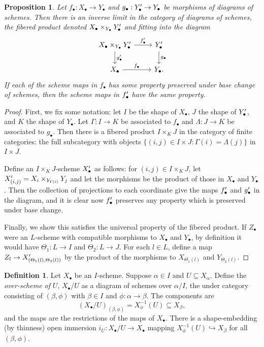 \documentclass[proquest]{uwthesis}[2014/11/13]
\newtheorem{prop}[theorem]{Proposition}
\theoremstyle{definition}
\newtheorem{definition}[theorem]{Definition}
\begin{document}
\begin{prop}
	\label{thm:fiberedprod}
	Let $f_\bullet : X_\bullet \rightarrow Y_\bullet$ and $g_\bullet : Y_\bullet\rq{} \rightarrow Y_\bullet$ be morphisms of diagrams of schemes.
	Then there is an inverse limit in the category of diagrams of schemes, the fibered product denoted $X_\bullet \times_{Y_\bullet} Y_\bullet\rq{}$ and fitting into the diagram
	\[
	\begin{tikzcd}
	X_\bullet \times_{Y_\bullet} Y_\bullet\rq{} \arrow{r}{f_\bullet\rq{}} \arrow{d}{g_\bullet\rq{}} & Y_\bullet\rq{} \arrow{d}{g_\bullet} \\
	X_\bullet \arrow{r}{f_\bullet} & Y_\bullet.
	\end{tikzcd}
	\]
	If each of the scheme maps in $f_\bullet$ has some property preserved under base change of schemes, then the scheme maps in $f_\bullet\rq{}$ have the same property.
\end{prop}
\begin{proof}
	First, we fix some notation: let $I$ be the shape of $X_\bullet$, $J$ the shape of $Y_\bullet\rq{}$, and $K$ the shape of $Y_\bullet$.
	Let $\Gamma : I \rightarrow K$ be associated to $f_\bullet$ and $\Lambda : J \rightarrow K$ be associated to $g_\bullet$.
	Then there is a fibered product $I \times_K J$ in the category of finite categories: the full subcategory with objects $\{(i, j) \in I \times J : \Gamma(i) = \Lambda(j) \}$ in $I \times J$.
	
	Define an $I \times_K J$-scheme $X_\bullet\rq{}$ as follows: for $(i, j) \in I \times_K J$, let $X_{(i,j)}\rq{} = X_i \times_{Y_{\Gamma(i)}} Y_j$ and let the morphisms be the product of those in $X_\bullet$ and $Y_\bullet$.
	Then the collection of projections to each coordinate give the maps $f_\bullet\rq{}$ and $g_\bullet\rq{}$ in the diagram, and it is clear now $f_\bullet\rq{}$ preserves any property which is preserved under base change.
	
	Finally, we show this satisfies the universal property of the fibered product.
	If $Z_\bullet$ were an $L$-scheme with compatible morphisms to $X_\bullet$ and $Y_\bullet$, by definition it would have $\Theta_1 : L \rightarrow I$ and $\Theta_2 : L \rightarrow J$.
	For each $l \in L$, define a map $Z_l \rightarrow X_{(\Theta_1(l), \Theta_2(l))}\rq{}$ by the product of the morphisms to $X_{\Theta_1(l)}$ and $Y_{\Theta_2(l)}$.
\end{proof}

\begin{definition}
	Let $X_\bullet$ be an $I$-scheme.
	Suppose $\alpha \in I$ and $U \subseteq X_\alpha$.
	Define the {\it over-scheme of} $U$, $X_\bullet/U$ as a diagram of schemes over $\alpha/I$, the under category consisting of $(\beta, \phi)$ with $\beta \in I$ and $\phi : \alpha \rightarrow \beta$.
	The components are
	\[
	(X_\bullet/U)_{(\beta, \phi)} = X_\phi^{-1} (U) \subseteq X_\beta,
	\]
	and the maps are the restrictions of the maps of $X_\bullet$.
	There is a shape-embedding (by thinness) open immersion $i_U : X_\bullet / U \rightarrow X_\bullet$ mapping $X_\phi^{-1}(U) \hookrightarrow X_\beta$ for all $(\beta, \phi)$.
\end{definition}
\end{document}
